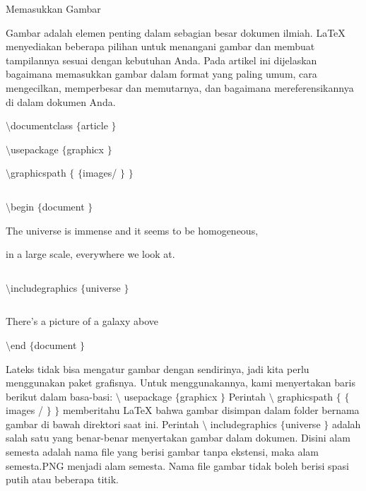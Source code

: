 \sloppy
\begin{center}{\fontsize{18pt}{18pt}\selectfont Memasukkan Gambar \\}\end{center} \par
\noindent 
\vspace{10pt}
\noindent 
{\fontsize{10pt}{10pt}\selectfont  \hspace*{0.64in} Gambar adalah elemen penting dalam sebagian besar dokumen ilmiah. LaTeX menyediakan beberapa pilihan untuk menangani gambar dan membuat tampilannya sesuai dengan kebutuhan Anda. Pada artikel ini dijelaskan bagaimana memasukkan gambar dalam format yang paling umum, cara mengecilkan, memperbesar dan memutarnya, dan bagaimana mereferensikannya di dalam dokumen Anda.} \par
\vspace{12pt}
\noindent 
 $  \setminus  $documentclass $  \{  $article $  \}  $ \par
\vspace{12pt}
\noindent 
 $  \setminus  $usepackage $  \{  $graphicx $  \}  $ \par
\vspace{12pt}
\noindent 
 $  \setminus  $graphicspath $  \{  $  $  \{  $images/ $  \}  $  $  \}  $ \par
\noindent 
 $  $ \par
\noindent 
 $  \setminus  $begin $  \{  $document $  \}  $ \par
\vspace{12pt}
\noindent 
The universe is immense and it seems to be homogeneous,  \par
\vspace{12pt}
\noindent 
in a large scale, everywhere we look at. \par
\noindent 
 $  $ \par
\noindent 
 $  \setminus  $includegraphics $  \{  $universe $  \}  $ \par
\noindent 
 $  $ \par
\noindent 
There's a picture of a galaxy above \par
\vspace{12pt}
\noindent 
 $  \setminus  $end $  \{  $document $  \}  $ \par
\vspace{12pt}
\vspace{14pt}
\noindent 
 \hspace*{0.5in} Lateks tidak bisa mengatur gambar dengan sendirinya, jadi kita perlu menggunakan paket grafisnya. Untuk menggunakannya, kami menyertakan baris berikut dalam basa-basi:  $  \setminus  $ usepackage  $  \{  $graphicx $  \}  $ Perintah  $  \setminus  $ graphicspath  $  \{  $ $  \{  $images / $  \}  $ $  \}  $ memberitahu LaTeX bahwa gambar disimpan dalam folder bernama gambar di bawah direktori saat ini. Perintah  $  \setminus  $ includegraphics  $  \{  $universe $  \}  $ adalah salah satu yang benar-benar menyertakan gambar dalam dokumen. Disini alam semesta adalah nama file yang berisi gambar tanpa ekstensi, maka alam semesta.PNG menjadi alam semesta. Nama file gambar tidak boleh berisi spasi putih atau beberapa titik. \par
